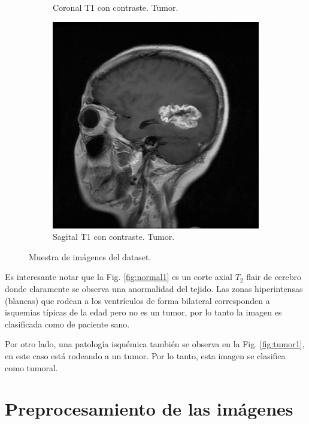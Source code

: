 \begin{figure}[H]
\begin{subfigure}[b]{0.3\textwidth}
        \caption{Coronal T1 con contraste. Tumor.}
        \label{fig:tumor2}
    \end{subfigure}
    \hfill
    \begin{subfigure}[b]{0.3\textwidth}
        \centering
        \includegraphics[width=\linewidth]{chapters/deteccion/images/cancer3.jpg}
        \caption{Sagital T1 con contraste. Tumor.}
        \label{fig:tumor3}
    \end{subfigure}
    \caption{Muestra de imágenes del dataset.}
    \label{fig:conjunto_imagenes}
\end{figure}

Es interesante notar que la Fig. \ref{fig:normal1} es un corte axial $T_2$ flair de cerebro donde claramente se observa una anormalidad del tejido. Las zonas hiperintensas (blancas) que rodean a los ventrículos de forma bilateral corresponden a isquemias típicas de la edad pero no es un tumor, por lo tanto la imagen es clasificada como de paciente sano. 

Por otro lado, una patología isquémica también se observa en la Fig. \ref{fig:tumor1}, en este caso está rodeando a un tumor. Por lo tanto, esta imagen se clasifica como tumoral. 

\section{Preprocesamiento de las imágenes}

